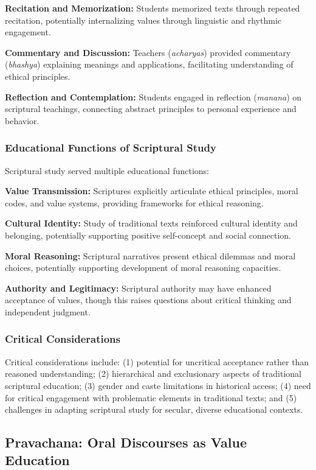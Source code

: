 \documentclass[12pt,a4paper,twocolumn]{article}
\begin{document}
\textbf{Recitation and Memorization:} Students memorized texts through repeated recitation, potentially internalizing values through linguistic and rhythmic engagement.

\textbf{Commentary and Discussion:} Teachers (\textit{acharyas}) provided commentary (\textit{bhashya}) explaining meanings and applications, facilitating understanding of ethical principles.

\textbf{Reflection and Contemplation:} Students engaged in reflection (\textit{manana}) on scriptural teachings, connecting abstract principles to personal experience and behavior.

\subsubsection{Educational Functions of Scriptural Study}

Scriptural study served multiple educational functions:

\textbf{Value Transmission:} Scriptures explicitly articulate ethical principles, moral codes, and value systems, providing frameworks for ethical reasoning.

\textbf{Cultural Identity:} Study of traditional texts reinforced cultural identity and belonging, potentially supporting positive self-concept and social connection.

\textbf{Moral Reasoning:} Scriptural narratives present ethical dilemmas and moral choices, potentially supporting development of moral reasoning capacities.

\textbf{Authority and Legitimacy:} Scriptural authority may have enhanced acceptance of values, though this raises questions about critical thinking and independent judgment.

\subsubsection{Critical Considerations}

Critical considerations include: (1) potential for uncritical acceptance rather than reasoned understanding; (2) hierarchical and exclusionary aspects of traditional scriptural education; (3) gender and caste limitations in historical access; (4) need for critical engagement with problematic elements in traditional texts; and (5) challenges in adapting scriptural study for secular, diverse educational contexts.

\subsection{Pravachana: Oral Discourses as Value Education}
\end{document}
